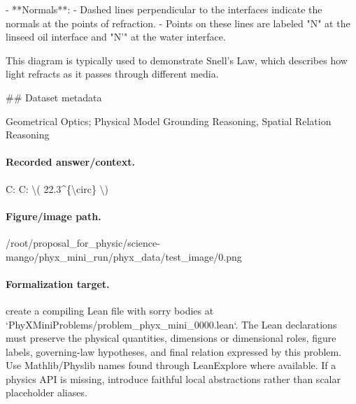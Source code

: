 - **Normals**: 
  - Dashed lines perpendicular to the interfaces indicate the normals at the points of refraction.
  - Points on these lines are labeled "N" at the linseed oil interface and "N'" at the water interface.

This diagram is typically used to demonstrate Snell's Law, which describes how light refracts as it passes through different media.

\#\# Dataset metadata

Geometrical Optics; Physical Model Grounding Reasoning, Spatial Relation Reasoning

\paragraph{Recorded answer/context.}
C: C: \textbackslash{}( 22.3\textasciicircum{}\{\textbackslash{}circ\} \textbackslash{})

\paragraph{Figure/image path.}
/root/proposal\_for\_physic/science-mango/phyx\_mini\_run/phyx\_data/test\_image/0.png

\paragraph{Formalization target.}
create a compiling Lean file with sorry bodies at `PhyXMiniProblems/problem\_phyx\_mini\_0000.lean`. The Lean declarations must preserve the physical quantities, dimensions or dimensional roles, figure labels, governing-law hypotheses, and final relation expressed by this problem.
Use Mathlib/Physlib names found through LeanExplore where available. If a physics API is missing, introduce faithful local abstractions rather than scalar placeholder aliases.

